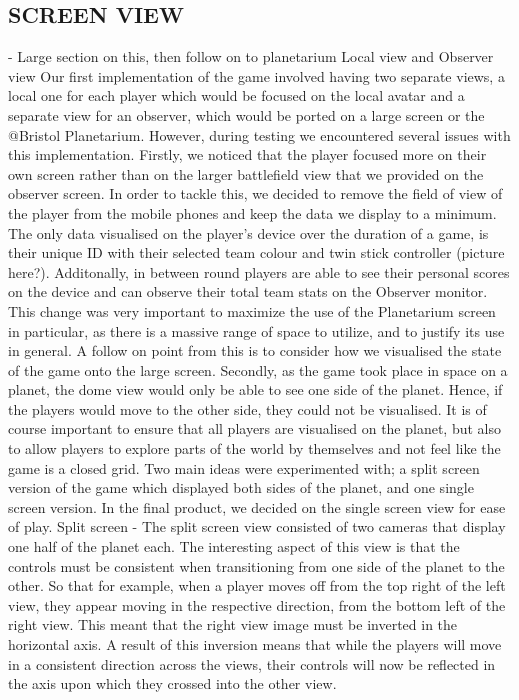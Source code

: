 \documentclass[11pt,a4paper]{article}
\begin{document}
  \subsection{SCREEN VIEW}
   - Large section on this, then follow on to planetarium
   Local view and Observer view
   Our first implementation of the game involved having two separate views, a local one for each player which would be focused on the local avatar and a separate view for an observer, which would be ported on a large screen or the @Bristol Planetarium. However, during testing we encountered several issues with this implementation. 
   Firstly, we noticed that the player focused more on their own screen rather than on the larger battlefield view that we provided on the observer screen. In order to tackle this, we decided to remove the field of view of the player from the mobile phones and keep the data we display to a minimum. The only data visualised on the player’s device over the duration of a game, is their unique ID with their selected team colour and twin stick controller (picture here?). Additonally, in between round players are able to see their personal scores on the device and can observe their total team stats on the Observer monitor. 
   This change was very important to maximize the use of the Planetarium screen in particular, as there is a massive range of space to utilize, and to justify its use in general. A follow on point from this is to consider how we visualised the state of the game onto the large screen. 
   Secondly, as the game took place in space on a planet, the dome view would only be able to see one side of the planet. Hence, if the players would move to the other side, they could not be visualised. It is of course important to ensure that all players are visualised on the planet, but also to allow players to explore parts of the world by themselves and not feel like the game is a closed grid. 
   Two main ideas were experimented with; a split screen version of the game which displayed both sides of the planet, and one single screen version. In the final product, we decided on the single screen view for ease of play.
   Split screen 
   - The split screen view consisted of two cameras that display one half of the planet each. The interesting aspect of this view is that the controls must be consistent when transitioning from one side of the planet to the other. So that for example, when a player moves off from the top right of the left view, they appear moving in the respective direction, from the bottom left of the right view. This meant that the right view image must be inverted in the horizontal axis. A result of this inversion means that while the players will move in a consistent direction across the views, their controls will now be reflected in the axis upon which they crossed into the other view.
\end{document}
